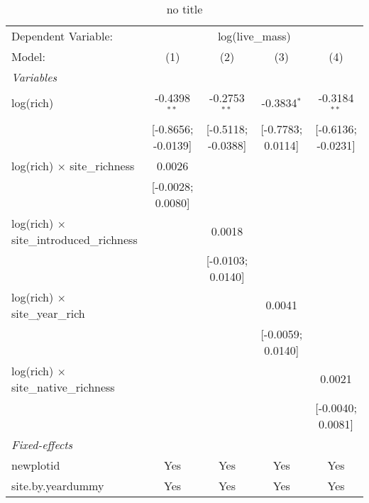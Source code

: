 
\begin{table}[htbp]
   \caption{no title}
   \centering
   \begin{tabular}{lcccc}
      \tabularnewline \midrule \midrule
      Dependent Variable: & \multicolumn{4}{c}{log(live\_mass)}\\
      Model:                                           & (1)                & (2)                & (3)               & (4)\\  
      \midrule
      \emph{Variables}\\
      log(rich)                                        & -0.4398$^{**}$     & -0.2753$^{**}$     & -0.3834$^{*}$     & -0.3184$^{**}$\\   
                                                       & [-0.8656; -0.0139] & [-0.5118; -0.0388] & [-0.7783; 0.0114] & [-0.6136; -0.0231]\\   
      log(rich) $\times$ site\_richness                & 0.0026             &                    &                   &   \\   
                                                       & [-0.0028; 0.0080]  &                    &                   &   \\   
      log(rich) $\times$ site\_introduced\_richness    &                    & 0.0018             &                   &   \\   
                                                       &                    & [-0.0103; 0.0140]  &                   &   \\   
      log(rich) $\times$ site\_year\_rich              &                    &                    & 0.0041            &   \\   
                                                       &                    &                    & [-0.0059; 0.0140] &   \\   
      log(rich) $\times$ site\_native\_richness        &                    &                    &                   & 0.0021\\   
                                                       &                    &                    &                   & [-0.0040; 0.0081]\\   
      \midrule
      \emph{Fixed-effects}\\
      newplotid                                        & Yes                & Yes                & Yes               & Yes\\  
      site.by.yeardummy                                & Yes                & Yes                & Yes               & Yes\\  

\end{tabular}
\end{table}
